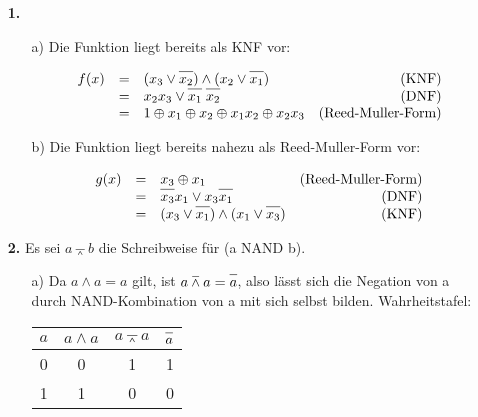 \documentclass[a4paper,10pt]{scrartcl}
\begin{document}
\begin{enumerate}
    \item[\textbf{1.}]
    \begin{enumerate}
        \item[a)]
            Die Funktion liegt bereits als KNF vor:

            $$\begin{array}{rclr}
                f(x) &=& (x_3 \vee \oline{x_2}) \wedge (x_2 \vee \oline{x_1}) & \text{(KNF)}\\
                &=& x_2 x_3 \vee \oline{x_1}\;\oline{x_2} & \text{(DNF)}\\
                &=& 1 \oplus x_1 \oplus x_2 \oplus x_1x_2 \oplus x_2x_3 & \text{(Reed-Muller-Form)}\\
            \end{array}$$

        \item[b)]
            Die Funktion liegt bereits nahezu als Reed-Muller-Form vor:

            $$\begin{array}{rclr}
                g(x) &=& x_3 \oplus x_1 & \text{(Reed-Muller-Form)}\\
                &=& \oline{x_3}x_1 \vee x_3\oline{x_1} & \text{(DNF)}\\
                &=& (x_3 \vee \oline{x_1}) \wedge (x_1 \vee \oline{x_3}) & \text{(KNF)}\\
            \end{array}$$

    \end{enumerate}

    \item[\textbf{2.}]
            Es sei $a \barwedge b$ die Schreibweise für (a NAND b).

    \begin{enumerate}
        \item[a)]
            Da $a \wedge a = a$ gilt, ist $a \barwedge a = \oline{a}$, also lässt sich die Negation von a durch NAND-Kombination
            von a mit sich selbst bilden. Wahrheitstafel:

            \hspace{1cm}\begin{tabular}[t]{c|c||c|c}
                $a$ & $a \wedge a$ & $a \barwedge a$ & $\oline{a}$ \\
                \hline
                0 & 0 & 1 & 1 \\
                1 & 1 & 0 & 0
            \end{tabular}


\end{enumerate}
\end{enumerate}
\end{document}
